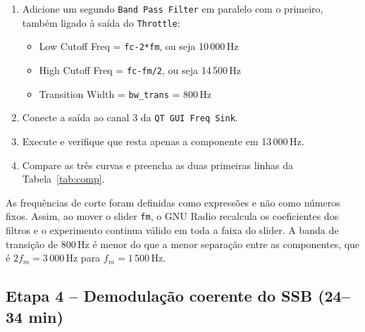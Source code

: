 \documentclass[11pt,a4paper]{article}
\begin{document}
\begin{instrucao}
\begin{enumerate}[label=\arabic*.]
  \item Adicione um segundo \texttt{Band Pass Filter} em paralelo com o
    primeiro, também ligado à saída do \texttt{Throttle}:
    \begin{itemize}
      \item Low Cutoff Freq = \texttt{fc-2*fm}, ou seja 10\,000\,Hz
      \item High Cutoff Freq = \texttt{fc-fm/2}, ou seja 14\,500\,Hz
      \item Transition Width = \texttt{bw\_trans} = 800\,Hz
    \end{itemize}
  \item Conecte a saída ao canal 3 da \texttt{QT GUI Freq Sink}.
  \item Execute e verifique que resta apenas a componente em 13\,000\,Hz.
  \item Compare as três curvas e preencha as duas primeiras linhas da
    Tabela~\ref{tab:comp}.
\end{enumerate}
\end{instrucao}

\begin{atencao}
As frequências de corte foram definidas como expressões e não como números
fixos. Assim, ao mover o slider \texttt{fm}, o GNU Radio recalcula os
coeficientes dos filtros e o experimento continua válido em toda a faixa do
slider. A banda de transição de 800\,Hz é menor do que a menor separação entre
as componentes, que é $2f_m = 3\,000$\,Hz para $f_m = 1\,500$\,Hz.
\end{atencao}

\subsection*{Etapa 4 -- Demodulação coerente do SSB (24--34 min)}
\end{document}
